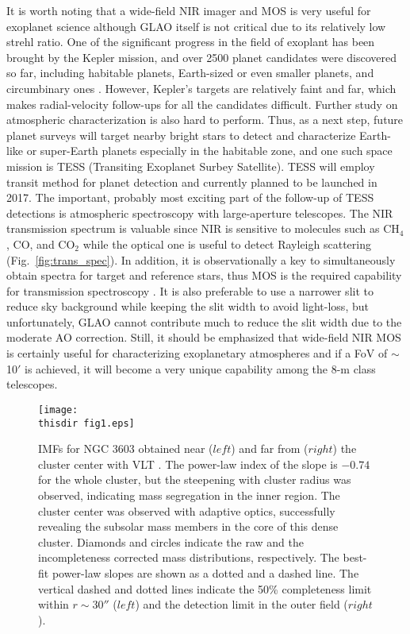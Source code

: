 It is worth noting that a wide-field NIR imager and MOS is very useful
for exoplanet science although GLAO itself is not critical due to its
relatively low strehl ratio. One of the significant progress in the
field of exoplant has been brought by the Kepler mission, and over 2500
planet candidates were discovered so far, including habitable planets,
Earth-sized or even smaller planets, and circumbinary ones
\citep{bor13,bor11}. However, Kepler's targets are relatively faint and
far, which makes radial-velocity follow-ups for all the candidates
difficult. Further study on atmospheric characterization is also hard to
perform. Thus, as a next step, future planet surveys will target nearby
bright stars to detect and characterize Earth-like or super-Earth
planets especially in the habitable zone, and one such space mission is
TESS (Transiting Exoplanet Surbey Satellite). TESS will employ transit
method for planet detection and currently planned to  be launched in
2017. The important, probably most exciting part of the follow-up of
TESS detections is atmospheric spectroscopy with large-aperture
telescopes. The NIR transmission spectrum is valuable  since NIR is
sensitive to molecules such as CH$_4$, CO, and CO$_2$ while the optical
one is useful to detect Rayleigh scattering \citep{nar13,ben12}
(Fig.~\ref{fig:trans_spec}). In addition, it is observationally a key to
simultaneously obtain spectra for target and reference stars, thus MOS
is the required capability for transmission spectroscopy
\citep{gib13}. It is also preferable to use a narrower slit to reduce
sky background while keeping the slit width to avoid light-loss, but
unfortunately, GLAO cannot contribute much to reduce the slit width due
to the moderate AO correction. Still, it should be emphasized that
wide-field NIR MOS is certainly  useful for characterizing exoplanetary
atmospheres and if a FoV of $\sim$10$'$ is achieved, it will become a
very unique capability among the 8-m class telescopes. 

\vspace{10mm}

\begin{figure}[htbp]
\centerline{
\texttt{[image: \\thisdir fig1.eps]}
}
\caption{IMFs for NGC 3603 obtained near ($left$) and far from ($right$)
 the cluster center with VLT \citep{har08}. The power-law index of the
 slope is $-0.74$ for the whole cluster, but the steepening with cluster
 radius was observed, indicating mass segregation in the inner
 region. The cluster center was observed with adaptive optics,
 successfully revealing the subsolar mass members in the core of this
 dense cluster. Diamonds and circles indicate the raw and the
 incompleteness corrected mass distributions, respectively. The best-fit
 power-law slopes are shown as a dotted and a dashed line.  The vertical
 dashed and dotted lines indicate the 50\% completeness limit within $r
 \sim 30''$ ($left$) and the detection limit in the outer field
 ($right$). }
\label{fig:imf}
\end{figure}

